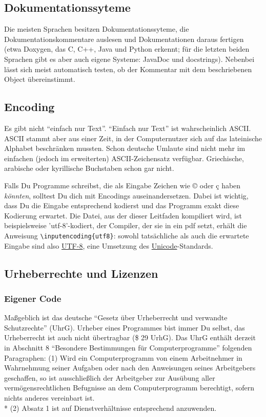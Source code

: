 \documentclass[twoside]{scrartcl}
\begin{document}
\subsection{Dokumentationssyteme}
Die meisten Sprachen besitzen Dokumentationssyteme, die Dokumentationskommentare
auslesen und Dokumentationen daraus fertigen (etwa Doxygen, das C, C++, Java und
Python erkennt; f\"u{}r die letzten beiden Sprachen gibt es aber auch eigene
Systeme: JavaDoc und docstrings). 
Nebenbei l\"a{}sst sich meist automatisch testen, ob der
Kommentar mit dem beschriebenen Object \"u{}bereinstimmt. 
\subsection{Encoding}
Es gibt nicht "`einfach nur Text"'. "`Einfach nur Text"' ist wahrscheinlich
ASCII. ASCII stammt aber aus einer Zeit, in der Computernutzer sich auf das
lateinische Alphabet beschr\"a{}nken mussten. Schon deutsche Umlaute sind nicht
mehr im einfachen (jedoch im erweiterten) ASCII-Zeichensatz verf\"u{}gbar.
Griechische, arabische oder kyrillische Buchstaben schon gar nicht. 


Falls Du Programme schreibst, die als Eingabe Zeichen wie ©  oder ç haben
\emph{k\"o{}nnten}, solltest Du dich mit Encodings auseinandersetzen. Dabei 
ist wichtig, dass Du die Eingabe entsprechend kodierst und das Programm exakt
diese Kodierung erwartet. Die Datei, aus der dieser Leitfaden kompiliert
wird, ist beispielsweise 'utf-8'-kodiert, der Compiler, der sie in ein pdf 
setzt, erh\"a{}lt die Anweisung \verb+\inputencoding{utf8}+: sowohl 
tats\"a{}chliche als auch die erwartete Eingabe sind also 
\href{http://en.wikipedia.org/wiki/UTF-8}{UTF-8}, eine Umsetzung des
\href{http://en.wikipedia.org/wiki/Unicode}{Unicode}-Standards.
\subsection{Urheberrechte und Lizenzen}
\subsubsection{Eigener Code}
Ma\ss{}geblich ist das deutsche "`Gesetz \"u{}ber Urheberrecht und verwandte
Schutzrechte"' (UhrG). 
Urheber eines Programmes bist immer Du selbst, das Urheberrecht ist auch nicht
\"u{}bertragbar (\$ 29 UrhG).
Das UhrG enth\"a{}lt derzeit in Abschnitt 8 "`Besondere Bestimmungen
f\"u{}r 
Computerprogramme"' folgenden Paragraphen:
(1) Wird ein Computerprogramm von einem Arbeitnehmer in Wahrnehmung seiner
Aufgaben oder nach den Anweisungen seines Arbeitgebers geschaffen, so ist
ausschlie\ss{}lich der Arbeitgeber zur Aus\"u{}bung aller 
verm\"o{}gensrechtlichen Befugnisse an dem Computerprogramm berechtigt, sofern 
nichts anderes vereinbart ist.\\*
(2) Absatz 1 ist auf Dienstverh\"a{}ltnisse entsprechend anzuwenden.
\end{document}
